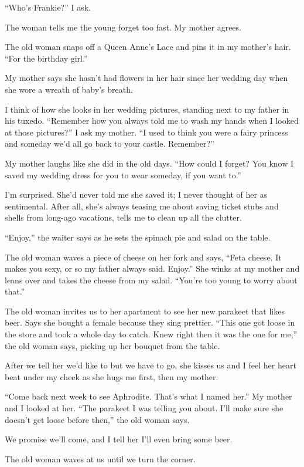 \documentclass[twoside,10pt]{book}
\begin{document}
``Who's Frankie?'' I ask.

The woman tells me the young forget too fast. My mother agrees.

The old woman snaps off a Queen Anne's Lace and pins it in my mother's
hair. ``For the birthday girl.''

My mother says she hasn't had flowers in her hair since her wedding day
when she wore a wreath of baby's breath.

I think of how she looks in her wedding pictures, standing next to my
father in his tuxedo. ``Remember how you always told me to wash my hands
when I looked at those pictures?'' I ask my mother. ``I used to think
you were a fairy princess and someday we'd all go back to your castle.
Remember?''

My mother laughs like she did in the old days. ``How could I forget? You
know I saved my wedding dress for you to wear someday, if you want to.''

I'm surprised. She'd never told me she saved it; I never thought of her
as sentimental. After all, she's always teasing me about saving ticket
stubs and shells from long-ago vacations, tells me to clean up all the
clutter.

``Enjoy,'' the waiter says as he sets the spinach pie and salad on the
table.

The old woman waves a piece of cheese on her fork and says, ``Feta
cheese. It makes you sexy, or so my father always said. Enjoy.'' She
winks at my mother and leans over and takes the cheese from my salad.
``You're too young to worry about that.''

The old woman invites us to her apartment to see her new parakeet that
likes beer. Says she bought a female because they sing prettier. ``This
one got loose in the store and took a whole day to catch. Knew right
then it was the one for me,'' the old woman says, picking up her bouquet
from the table.

After we tell her we'd like to but we have to go, she kisses us and I
feel her heart beat under my cheek as she hugs me first, then my mother.

``Come back next week to see Aphrodite. That's what I named her.'' My
mother and I looked at her. ``The parakeet I was telling you about. I'll
make sure she doesn't get loose before then,'' the old woman says.

We promise we'll come, and I tell her I'll even bring some beer.

The old woman waves at us until we turn the corner.
\end{document}
